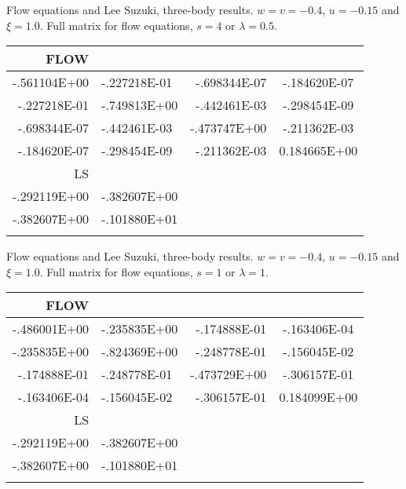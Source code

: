 Flow equations and Lee Suzuki, three-body results. 
$w=v=-0.4$, $u=-0.15$ and $\xi=1.0$. Full matrix for flow equations, $s=4$ or $\lambda=0.5$. 
\begin{center}
\begin{tabular}{rlrc}\\\hline
FLOW& & & \\ \hline
 -.561104E+00 &   -.227218E-01 &   -.698344E-07 &   -.184620E-07\\
    -.227218E-01 &   -.749813E+00 &   -.442461E-03  &  -.298454E-09\\
    -.698344E-07 &   -.442461E-03  &  -.473747E+00 &   -.211362E-03\\
    -.184620E-07  &  -.298454E-09  &  -.211362E-03 &   0.184665E+00\\
LS& & & \\ \hline
-.292119E+00  &  -.382607E+00 &  &   \\
-.382607E+00  &  -.101880E+01 &  &    \\
& &  & \\ \hline
\end{tabular} 
\end{center} 
Flow equations and Lee Suzuki, three-body results. 
$w=v=-0.4$, $u=-0.15$ and $\xi=1.0$. Full matrix for flow equations, $s=1$ or $\lambda=1$. 
\begin{center}
\begin{tabular}{rlrc}\\\hline
FLOW& & & \\ \hline
   -.486001E+00 &   -.235835E+00 &   -.174888E-01 &   -.163406E-04\\
    -.235835E+00 &   -.824369E+00 &   -.248778E-01  &  -.156045E-02\\
    -.174888E-01 &   -.248778E-01 &   -.473729E+00 &   -.306157E-01\\
    -.163406E-04 &   -.156045E-02 &   -.306157E-01 &   0.184099E+00\\
LS& & & \\ \hline
-.292119E+00  &  -.382607E+00 &  &   \\
-.382607E+00  &  -.101880E+01 &  &    \\
& &  & \\ \hline
\end{tabular} 
\end{center} 















 
